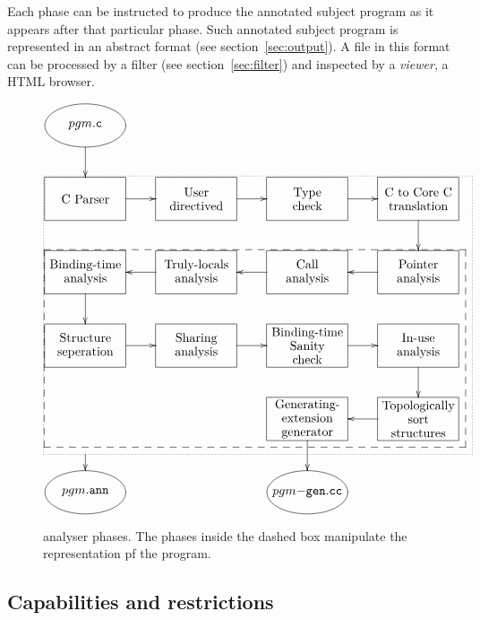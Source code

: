 \begin{docpart}
Each phase can be instructed to produce the annotated subject program
as it appears after that particular phase.  Such annotated subject
program is represented in an abstract format (see
section~\ref{sec:output}). A file in this format can be processed by a
filter (see section~\ref{sec:filter}) and inspected by a
\emph{viewer}, \eg a HTML browser.

\begin{figure}[htbp]
  \begin{center}
\[
\entrymodifiers={=<15ex,8ex>[F]}
\xymatrix{
  *=<15ex,8ex>[o][F]{pgm\mathtt{.c}} \ar[d] \\
  {\txt{C Parser}} \ar[r] & {\txt{User\\directived}} \ar[r] & {\txt{Type\\check}}
   \ar[r] & {\txt{C to \coreC\\translation}} \ar[d] \\
  {\txt{Binding-time\\analysis}} \ar[d] &
  {\txt{Truly-locals\\analysis}} \ar[l] & {\txt{Call\\analysis}}
  \ar[l] & {\txt{Pointer\\analysis}} 
  \ar[l] \\
  {\txt{Structure\\seperation}} \ar[r] & {\txt{Sharing\\analysis}}
  \ar[r] & {\txt{Binding-time\\Sanity\\check}}\ar[r] & {\txt{In-use\\analysis}} \ar[d] \\
   *{} & *{} & {\txt{Generating-\\extension\\generator}} \ar[d] &
   {\txt{Topologically\\sort\\structures}}
  \ar[l] 
  \save "3,1"."5,4"*+[F--]\frm{}\restore
  \save "2,1"."5,4"*++[F.]\frm{} \ar"6,1" \restore \\
  *=<15ex,8ex>[o][F]{pgm\mathtt{.ann}} & *{} & *=<15ex,8ex>[o][F]{pgm\mathtt{-gen.cc}} \\
  }
\]
    \caption{\cmix analyser phases. The phases inside the dashed box
      manipulate the \coreC representation pf the program.}
    \label{fig:phases}
  \end{center}
\end{figure}


\subsection{Capabilities and restrictions}
\label{sec:CapabilitiesAndRestricitions}


\end{docpart}
